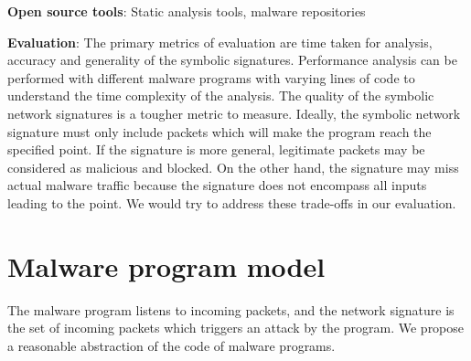 \documentclass[]{article}
\begin{document}
\noindent\textbf{Open source tools}: Static analysis tools, malware repositories

\noindent\textbf{Evaluation}: 
The primary metrics of evaluation are time taken for analysis, accuracy and 
generality of the symbolic signatures. Performance analysis can be performed 
with different malware programs with varying lines of code to understand
the time complexity of the analysis. The quality of the symbolic network
signatures is a tougher metric to measure. Ideally, the symbolic network 
signature must only include packets which will make the program reach the
specified point. If the signature is more general, legitimate packets may 
be considered as malicious and blocked. On the other hand, the signature
may miss actual malware traffic because the signature does not encompass
all inputs leading to the point. We would try to address these trade-offs in
our evaluation.

\appendix
\section{Malware program model} \label{sec:malwaremodel}
The malware program listens to incoming packets, and the
network signature is the set of incoming packets which triggers
an attack by the program. We propose a reasonable abstraction
of the code of malware programs. 
\end{document}
